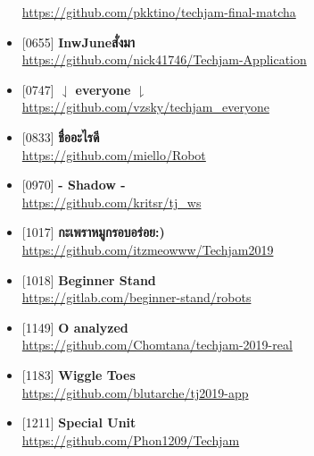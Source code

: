 \begin{itemize}[parsep=0pc]
        \href{https://github.com/pkktino/techjam-final-matcha/tree/a71d0717cdf749507a94644f232d077192fc1017}{\ttfamily https://github.com/pkktino/techjam-final-matcha}
    \item{} [0655] \textbf{InwJuneสั่งมา} \\
        \href{https://github.com/nick41746/Techjam-Application/tree/3307ab05b4ca3983d7964f66ee60d0b6bdc6f2f2}{\ttfamily https://github.com/nick41746/Techjam-Application}
    \item{} [0747] \textbf{$\boldsymbol{\downharpoonleft}$ everyone $\boldsymbol{\downharpoonright}$} \\
        \href{https://github.com/vzsky/techjam_everyone/tree/020c1199ba17abd2fe7d6f15c90fdcee1fb07696}{\ttfamily https://github.com/vzsky/techjam\_everyone}
    \item{} [0833] \textbf{ชื่ออะไรดี} \\
        \href{https://github.com/miello/Robot/tree/a9eb31413612c9e3a689999e52bedb1824a09829}{\ttfamily https://github.com/miello/Robot}
    \item{} [0970] \textbf{- Shadow -} \\
        \href{https://github.com/kritsr/tj_ws/tree/e5f6e1aee4632bc747703bbf479d1a325325dfb5}{\ttfamily https://github.com/kritsr/tj\_ws}
    \item{} [1017] \textbf{กะเพราหมูกรอบอร่อย:)} \\
        \href{https://github.com/itzmeowww/Techjam2019/tree/508cac3fc733fd92489e3602407ecd340a4d5da2}{\ttfamily https://github.com/itzmeowww/Techjam2019}
    \item{} [1018] \textbf{Beginner Stand} \\
        \href{https://gitlab.com/beginner-stand/robots/tree/996366e13662628e5996c3c79695d24701ebf89c}{\ttfamily https://gitlab.com/beginner-stand/robots}
    \item{} [1149] \textbf{O analyzed} \\
        \href{https://github.com/Chomtana/techjam-2019-real/tree/413670206e1598ac232b84a33016301f52c7ace1}{\ttfamily https://github.com/Chomtana/techjam-2019-real}
    \item{} [1183] \textbf{Wiggle Toes} \\
        \href{https://github.com/blutarche/tj2019-app/tree/d6c1ce62b67333fdbb35f576947a8a18a944c623}{\ttfamily https://github.com/blutarche/tj2019-app}
    \item{} [1211] \textbf{Special Unit} \\
        \href{https://github.com/Phon1209/Techjam/tree/4b640c4c2c79fa6d9b9d00a9055f327d7f596e5c}{\ttfamily https://github.com/Phon1209/Techjam}

\end{itemize}
